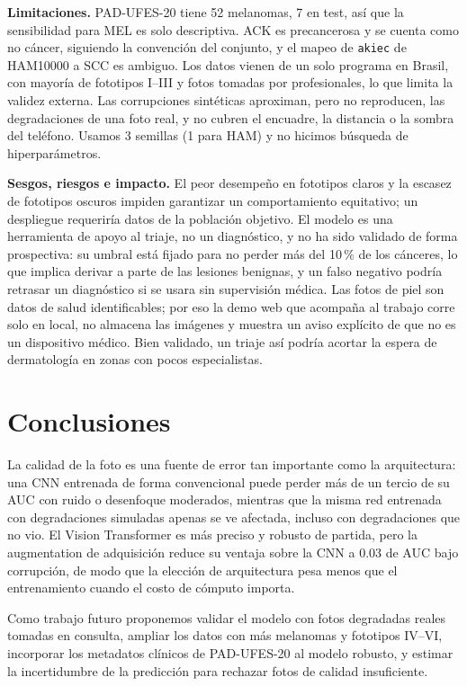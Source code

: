 \documentclass[conference]{IEEEtran}
\begin{document}
\textbf{Limitaciones.} PAD-UFES-20 tiene 52 melanomas, 7 en test, así que la sensibilidad para MEL es solo descriptiva. ACK es precancerosa y se cuenta como no cáncer, siguiendo la convención del conjunto, y el mapeo de \texttt{akiec} de HAM10000 a SCC es ambiguo. Los datos vienen de un solo programa en Brasil, con mayoría de fototipos I--III y fotos tomadas por profesionales, lo que limita la validez externa. Las corrupciones sintéticas aproximan, pero no reproducen, las degradaciones de una foto real, y no cubren el encuadre, la distancia o la sombra del teléfono. Usamos 3 semillas (1 para HAM) y no hicimos búsqueda de hiperparámetros.

\textbf{Sesgos, riesgos e impacto.} El peor desempeño en fototipos claros y la escasez de fototipos oscuros impiden garantizar un comportamiento equitativo; un despliegue requeriría datos de la población objetivo. El modelo es una herramienta de apoyo al triaje, no un diagnóstico, y no ha sido validado de forma prospectiva: su umbral está fijado para no perder más del 10\,\% de los cánceres, lo que implica derivar a parte de las lesiones benignas, y un falso negativo podría retrasar un diagnóstico si se usara sin supervisión médica. Las fotos de piel son datos de salud identificables; por eso la demo web que acompaña al trabajo corre solo en local, no almacena las imágenes y muestra un aviso explícito de que no es un dispositivo médico. Bien validado, un triaje así podría acortar la espera de dermatología en zonas con pocos especialistas.

\section{Conclusiones}
\label{sec:conclusions}

La calidad de la foto es una fuente de error tan importante como la arquitectura: una CNN entrenada de forma convencional puede perder más de un tercio de su AUC con ruido o desenfoque moderados, mientras que la misma red entrenada con degradaciones simuladas apenas se ve afectada, incluso con degradaciones que no vio. El Vision Transformer es más preciso y robusto de partida, pero la augmentation de adquisición reduce su ventaja sobre la CNN a 0.03 de AUC bajo corrupción, de modo que la elección de arquitectura pesa menos que el entrenamiento cuando el costo de cómputo importa.

Como trabajo futuro proponemos validar el modelo con fotos degradadas reales tomadas en consulta, ampliar los datos con más melanomas y fototipos IV--VI, incorporar los metadatos clínicos de PAD-UFES-20 al modelo robusto, y estimar la incertidumbre de la predicción para rechazar fotos de calidad insuficiente.
\end{document}
